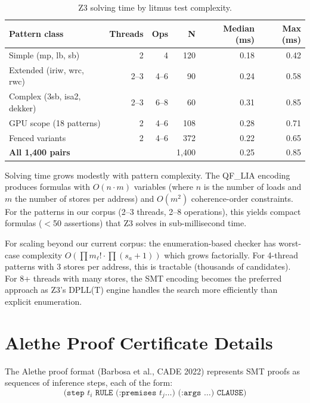 \documentclass[11pt]{article}
\begin{document}
\begin{table}[ht]
\centering
\caption{Z3 solving time by litmus test complexity.}
\label{tab:scaling}
\small
\begin{tabular}{lrrrrr}
\toprule
\textbf{Pattern class} & \textbf{Threads} & \textbf{Ops} & \textbf{N} &
  \textbf{Median (ms)} & \textbf{Max (ms)} \\
\midrule
Simple (mp, lb, sb)       & 2 & 4  & 120 & 0.18 & 0.42 \\
Extended (iriw, wrc, rwc) & 2--3 & 4--6 & 90 & 0.24 & 0.58 \\
Complex (3sb, isa2, dekker) & 2--3 & 6--8 & 60 & 0.31 & 0.85 \\
GPU scope (18 patterns)   & 2 & 4--6 & 108 & 0.28 & 0.71 \\
Fenced variants           & 2 & 4--6 & 372 & 0.22 & 0.65 \\
\midrule
\textbf{All 1{,}400 pairs}    &  &  & 1{,}400 & 0.25 & 0.85 \\
\bottomrule
\end{tabular}
\end{table}

\noindent
Solving time grows modestly with pattern complexity.  The QF\_LIA
encoding produces formulas with $O(n \cdot m)$ variables (where
$n$ is the number of loads and $m$ the number of stores per address)
and $O(m^2)$ coherence-order constraints.  For the patterns in our
corpus (2--3 threads, 2--8 operations), this yields compact formulas
($<$50 assertions) that Z3 solves in sub-millisecond time.

For scaling beyond our current corpus: the enumeration-based checker
has worst-case complexity $O(\prod m_\ell! \cdot \prod (s_a+1))$
which grows factorially.  For 4-thread patterns with 3 stores per
address, this is tractable (thousands of candidates).  For 8+ threads
with many stores, the SMT encoding becomes the preferred approach
as Z3's DPLL(T) engine handles the search more efficiently than
explicit enumeration.

\section{Alethe Proof Certificate Details}
\label{app:alethe-details}

The Alethe proof format (Barbosa et al., CADE 2022) represents
SMT proofs as sequences of inference steps, each of the form:
\[
\texttt{(step } t_i \texttt{ RULE (:premises } t_j \ldots \texttt{) (:args \ldots) CLAUSE)}
\]
\end{document}
